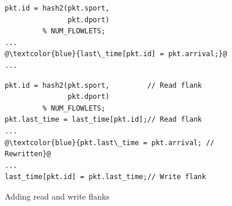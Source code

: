 \begin{figure}[!t]
  \begin{minipage}{0.43\textwidth}
  \begin{small}
  \begin{lstlisting}[style=customc]
pkt.id = hash2(pkt.sport,
               pkt.dport)
         % NUM_FLOWLETS;
...
@\textcolor{blue}{last\_time[pkt.id] = pkt.arrival;}@
...
  \end{lstlisting}
  \end{small}
  \end{minipage}
  \begin{minipage}{0.61\textwidth}
  \begin{small}
  \begin{lstlisting}[style=customc]
pkt.id = hash2(pkt.sport,         // Read flank
               pkt.dport)
         % NUM_FLOWLETS;
pkt.last_time = last_time[pkt.id];// Read flank
...
@\textcolor{blue}{pkt.last\_time = pkt.arrival; // Rewritten}@
...
last_time[pkt.id] = pkt.last_time;// Write flank
  \end{lstlisting}
  \end{small}
  \end{minipage}
  \caption{Adding read and write flanks}
\label{fig:stateful_flanks}
\end{figure}

